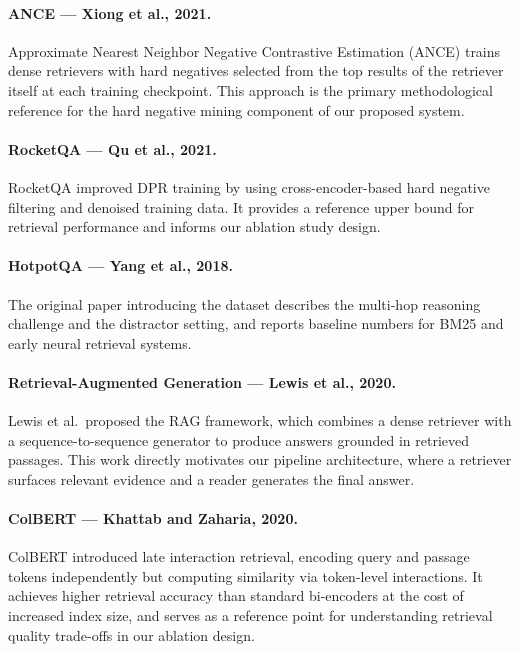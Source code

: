 \documentclass[12pt,a4paper]{article}
\begin{document}
\paragraph{ANCE — Xiong et al., 2021.}
Approximate Nearest Neighbor Negative Contrastive Estimation (ANCE) trains dense
retrievers with hard negatives selected from the top results of the retriever itself
at each training checkpoint. This approach is the primary methodological reference
for the hard negative mining component of our proposed system.

\paragraph{RocketQA — Qu et al., 2021.}
RocketQA improved DPR training by using cross-encoder-based hard negative filtering
and denoised training data. It provides a reference upper bound for retrieval
performance and informs our ablation study design.

\paragraph{HotpotQA — Yang et al., 2018.}
The original paper introducing the dataset describes the multi-hop reasoning challenge
and the distractor setting, and reports baseline numbers for BM25 and early neural
retrieval systems.

\paragraph{Retrieval-Augmented Generation --- Lewis et al., 2020.}
Lewis et al.\ proposed the RAG framework, which combines a dense retriever with
a sequence-to-sequence generator to produce answers grounded in retrieved passages.
This work directly motivates our pipeline architecture, where a retriever surfaces
relevant evidence and a reader generates the final answer.

\paragraph{ColBERT --- Khattab and Zaharia, 2020.}
ColBERT introduced late interaction retrieval, encoding query and passage tokens
independently but computing similarity via token-level interactions. It achieves
higher retrieval accuracy than standard bi-encoders at the cost of increased index
size, and serves as a reference point for understanding retrieval quality trade-offs
in our ablation design.
\end{document}
